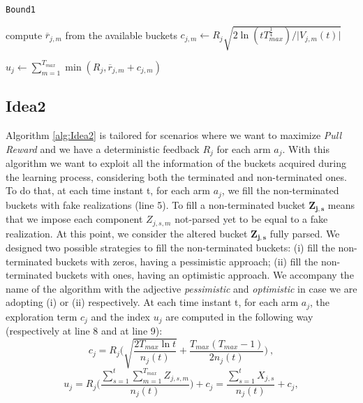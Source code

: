 \begin{algorithm}[H]
	\caption{\texttt{Bound1}}
	\begin{scriptsize}
		\begin{algorithmic}[1]
			
			
			
			
			
			\State compute $\overline{r}_{j,m}$ from the available buckets \;
			\State$c_{j,m}\gets R_j \sqrt{{2\ln(tT_{max}^{\frac{1}{4}})}/{\vert V_{j,m}(t) \vert}}$\;
			
			\EndFor		
			
			\State $u_j \gets \sum_{m=1}^{T_{max}} \min(R_j,\overline{r}_{j,m}+c_{j,m}) $\;	
			\EndFor
			
			
			
			
			\EndFunction
			
		\end{algorithmic}
	\end{scriptsize}
	\label{alg:Bound1}
\end{algorithm}

\subsection{Idea2}
Algorithm \ref{alg:Idea2} is tailored for scenarios where we want to maximize \emph{Pull Reward} and we have a deterministic feedback $R_j$ for each arm $a_j$. With this algorithm we want to exploit all the information of the buckets acquired during the learning process, considering both the terminated and non-terminated ones. To do that, at each time instant t, for each arm $a_j$, we fill the non-terminated buckets with fake realizations (line 5). To fill a non-terminated bucket $\boldsymbol{Z_{j,s}}$ means that we impose each component $Z_{j,s,m}$ not-parsed yet to be equal to a fake realization. At this point, we consider the altered bucket $\boldsymbol{Z_{j,s}}$ fully parsed. We designed two possible strategies to fill the non-terminated buckets: (i)
fill the non-terminated buckets with zeros, having a pessimistic approach; (ii) fill the non-terminated buckets with ones, having an optimistic approach. We accompany the name of the algorithm with the adjective \emph{pessimistic} and \emph{optimistic} in case we are adopting (i) or (ii) respectively. At each time instant t, for each arm $a_j$, the exploration term $c_j$ and the index $u_j$ are computed in the following way (respectively at line 8 and at line 9):
$$c_j = R_j \bigg( \sqrt{\frac{2T_{max}\ln{t}}{n_j(t)}} + \frac{T_{max}(T_{max}-1)}{2n_j(t)} \bigg) \ ,$$ 
$$
u_j = R_j \bigg( \frac{\sum_{s=1}^{t}\sum_{m=1}^{T_{max}}Z_{j,s,m}}{n_j(t)}\bigg)+c_j   = \frac{\sum_{s=1}^{t} X_{j,s}}{n_j(t)} +c_j  ,
$$

